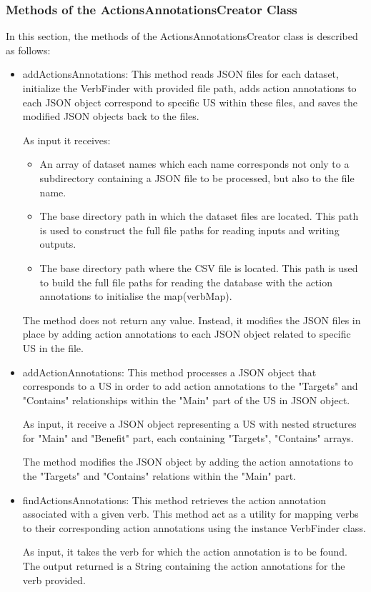 \subsubsection*{Methods of the ActionsAnnotationsCreator Class}
In this section, the methods of the ActionsAnnotationsCreator class is described as follows:
\begin{itemize}	
	\item addActionsAnnotations: This method reads JSON files for each dataset, initialize the VerbFinder with provided file path, adds action annotations to each JSON object correspond to specific US within these files, and saves the modified JSON objects back to the files.
	
	As input it receives:
	\begin{itemize}
		\item An array of dataset names which each name corresponds not only to a subdirectory containing a JSON file to be processed, but also to the file name. 
		
		\item The base directory path in which the dataset files are located. This path is used to construct the full file paths for reading inputs and writing outputs.
		
		\item The base directory path where the CSV file is located. This path is used to build the full file paths for reading the database with the action annotations to initialise the map(verbMap).
	\end{itemize}
	
	The method does not return any value. Instead, it modifies the JSON files in place by adding action annotations to each JSON object related to specific US in the file.
	
	\item addActionAnnotations: This method processes a JSON object that corresponds to a US in order to add action annotations to the "Targets" and "Contains" relationships within the "Main" part of the US in JSON object.
	
	As input, it receive a JSON object representing a US with nested structures for "Main" and "Benefit" part, each containing "Targets", "Contains" arrays.
	
	The method modifies the JSON object by adding the action annotations to the "Targets" and "Contains" relations within the "Main" part.
		
	\item findActionsAnnotations: This method retrieves the action annotation associated with a given verb. This method act as a utility for mapping verbs to their corresponding action annotations using the instance VerbFinder class.
	
	As input, it takes the verb for which the action annotation is to be found. The output returned is a String containing the action annotations for the verb provided.	
\end{itemize}

